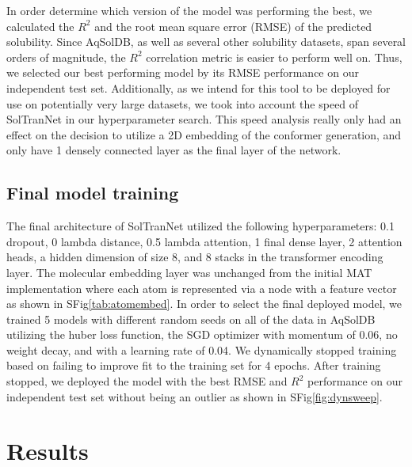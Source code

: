 \documentclass[journal=jmcmar,manuscript=article]{achemso}
\begin{document}
In order determine which version of the model was performing the best, we calculated the $R^2$ and the root mean square error (RMSE) of the predicted solubility.
Since AqSolDB, as well as several other solubility datasets, span several orders of magnitude, the $R^2$ correlation metric is easier to perform well on.
Thus, we selected our best performing model by its RMSE performance on our independent test set.
Additionally, as we intend for this tool to be deployed for use on potentially very large datasets, we took into account the speed of SolTranNet in our hyperparameter search.
This speed analysis really only had an effect on the decision to utilize a 2D embedding of the conformer generation, and only have 1 densely connected layer as the final layer of the network.

\subsection{Final model training}
The final architecture of SolTranNet utilized the following hyperparameters: 0.1 dropout, 0 lambda distance, 0.5 lambda attention, 1 final dense layer, 2 attention heads, a hidden dimension of size 8, and 8 stacks in the transformer encoding layer.
The molecular embedding layer was unchanged from the initial MAT implementation\cite{MAT} where each atom is represented via a node with a feature vector as shown in SFig\ref{tab:atomembed}.
In order to select the final deployed model, we trained 5 models with different random seeds on all of the data in AqSolDB utilizing the huber loss function, the SGD optimizer with momentum of 0.06, no weight decay, and with a learning rate of 0.04.
We dynamically stopped training based on failing to improve fit to the training set for 4 epochs.
After training stopped, we deployed the model with the best RMSE and $R^2$ performance on our independent test set without being an outlier as shown in SFig\ref{fig:dynsweep}.

\section{Results}
\end{document}
